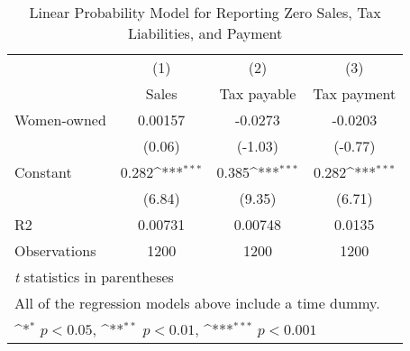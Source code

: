 \begin{table}[htbp]\centering
\def\sym#1{\ifmmode^{#1}\else\(^{#1}\)\fi}
\caption{Linear Probability Model for Reporting Zero Sales, Tax Liabilities, and Payment}
\begin{tabular}{l*{3}{c}}
\hline\hline
            &\multicolumn{1}{c}{(1)}&\multicolumn{1}{c}{(2)}&\multicolumn{1}{c}{(3)}\\
            &\multicolumn{1}{c}{Sales}&\multicolumn{1}{c}{Tax payable}&\multicolumn{1}{c}{Tax payment}\\
\hline
Women-owned &     0.00157         &     -0.0273         &     -0.0203         \\
            &      (0.06)         &     (-1.03)         &     (-0.77)         \\
[1em]
Constant    &       0.282\sym{***}&       0.385\sym{***}&       0.282\sym{***}\\
            &      (6.84)         &      (9.35)         &      (6.71)         \\
\hline
R2          &     0.00731         &     0.00748         &      0.0135         \\
Observations&        1200         &        1200         &        1200         \\
\hline\hline
\multicolumn{4}{l}{\footnotesize \textit{t} statistics in parentheses}\\
\multicolumn{4}{l}{\footnotesize All of the regression models above include a time dummy.}\\
\multicolumn{4}{l}{\footnotesize \sym{*} \(p<0.05\), \sym{**} \(p<0.01\), \sym{***} \(p<0.001\)}\\
\end{tabular}
\end{table}
